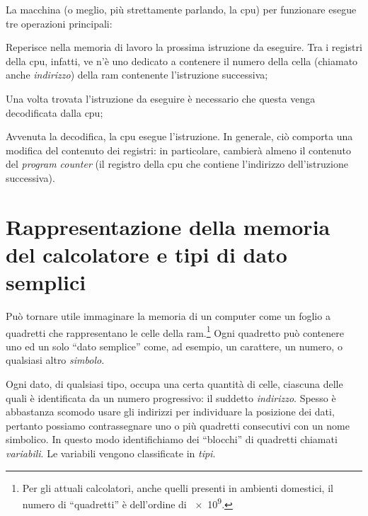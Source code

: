 La  macchina (o meglio, più strettamente parlando, la \ac{cpu}) per funzionare esegue tre operazioni principali:
\begin{description}[]
	\item
[Fetch\index{fetch}] Reperisce nella memoria di lavoro la prossima istruzione da eseguire.
Tra i registri della \ac{cpu}, infatti, ve n'è uno dedicato a contenere il numero della cella (chiamato anche \emph{indirizzo}) della \ac{ram} contenente l'istruzione successiva;
	\item
[Decode\index{decode}] Una volta trovata l'istruzione da eseguire è necessario che questa venga decodificata dalla \ac{cpu};
	\item
[Execute\index{execute}] Avvenuta la decodifica, la \ac{cpu} esegue l'istruzione.
In generale, ciò comporta una modifica del contenuto dei registri: in particolare, cambierà almeno il contenuto del \emph{program counter} (il registro della \ac{cpu} che contiene l'indirizzo dell'istruzione successiva).
\end{description}

	\section{Rappresentazione della memoria del calcolatore e tipi di dato semplici}
	\label{sec:mem}
Può tornare utile immaginare la memoria di un computer come un foglio a quadretti che rappresentano le celle della \ac{ram}.\footnote{Per gli attuali calcolatori, anche quelli presenti in ambienti domestici, il numero di ``quadretti'' è dell'ordine di \num{e9}.}
Ogni quadretto può contenere uno ed un solo ``dato semplice'' come,  ad esempio, un carattere, un numero, o qualsiasi altro \emph{simbolo}.

Ogni dato, di qualsiasi tipo, occupa una certa quantità di celle, ciascuna delle quali è identificata da un numero progressivo: il suddetto \emph{indirizzo}. %
Spesso è abbastanza scomodo usare gli indirizzi per individuare la posizione dei dati, pertanto possiamo contrassegnare uno o più quadretti consecutivi con un nome simbolico.
In questo modo identifichiamo dei ``blocchi'' di quadretti  chiamati \emph{variabili}. Le variabili vengono classificate in \emph{tipi}.


